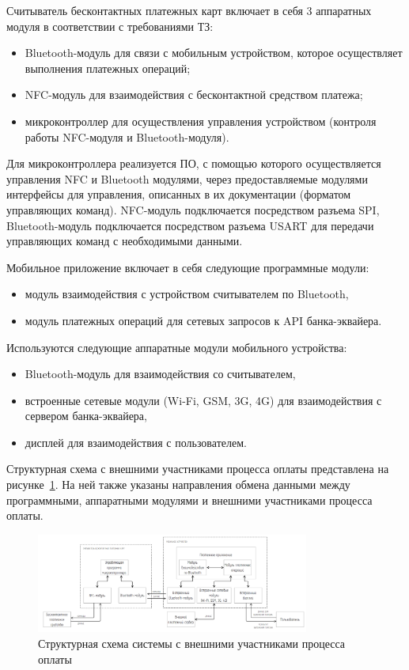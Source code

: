 Считыватель бесконтактных платежных карт включает в себя 3 аппаратных модуля в соответствии с требованиями ТЗ:
\begin{itemize}
    \item Bluetooth-модуль для связи с мобильным устройством, которое осуществляет выполнения платежных операций;
    \item NFC-модуль для взаимодействия с бесконтактной средством платежа;
    \item микроконтроллер для осуществления управления устройством (контроля работы NFC-модуля и Bluetooth-модуля).
\end{itemize}

Для микроконтроллера реализуется ПО, с помощью которого осуществляется управления NFC и Bluetooth модулями, через предоставляемые модулями интерфейсы для управления, описанных в их документации (форматом управляющих команд).
NFC-модуль подключается посредством разъема SPI, Bluetooth-модуль подключается посредством разъема USART для передачи управляющих команд с необходимыми данными.


Мобильное приложение включает в себя следующие программные модули:
\begin{itemize}
    \item модуль взаимодействия с устройством считывателем по Bluetooth,
    \item модуль платежных операций для сетевых запросов к API банка-эквайера.
\end{itemize}

Используются следующие аппаратные модули мобильного устройства:
\begin{itemize}
    \item Bluetooth-модуль для взаимодействия со считывателем,
    \item встроенные сетевые модули (Wi-Fi, GSM, 3G, 4G) для взаимодействия с сервером банка-эквайера,
    \item дисплей для взаимодействия с пользователем.
\end{itemize}

Структурная схема с внешними участниками процесса оплаты представлена на рисунке~\ref{fig:struct_scheme_out}.
На ней также указаны направления обмена данными между программными, аппаратными модулями и внешними участниками процесса оплаты.

\begin{figure}[H]
    \centering
    \includegraphics[width=0.8\textwidth]{images/design/struct_scheme_out}
    \caption{\centering Структурная схема системы с внешними участниками процесса оплаты}
    \label{fig:struct_scheme_out}
\end{figure}


